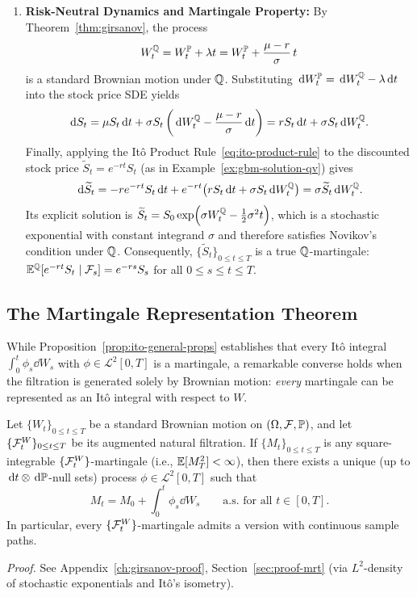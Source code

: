 \begin{example}
\begin{enumerate}
    \item \textbf{Risk-Neutral Dynamics and Martingale Property:} By Theorem~\ref{thm:girsanov}, the process
    \[
    W_t^{\mathbb{Q}} = W_t^{\mathbb{P}} + \lambda t = W_t^{\mathbb{P}} + \frac{\mu - r}{\sigma}\,t
    \]
    is a standard Brownian motion under $\mathbb{Q}$. Substituting $\,\mathrm{d} W_t^{\mathbb{P}} = \,\mathrm{d} W_t^{\mathbb{Q}} - \lambda \,\mathrm{d} t$ into the stock price SDE yields
    \[
    \,\mathrm{d} S_t = \mu S_t \,\mathrm{d} t + \sigma S_t\left(\,\mathrm{d} W_t^{\mathbb{Q}} - \frac{\mu - r}{\sigma}\,\mathrm{d} t\right) = r S_t \,\mathrm{d} t + \sigma S_t \,\mathrm{d} W_t^{\mathbb{Q}}.
    \]
    Finally, applying the It\^o Product Rule~\eqref{eq:ito-product-rule} to the discounted stock price $\widetilde{S}_t = e^{-rt} S_t$ (as in Example~\ref{ex:gbm-solution-qv}) gives
    \[
    \,\mathrm{d}\widetilde{S}_t = -r e^{-rt} S_t \,\mathrm{d} t + e^{-rt}\big(r S_t \,\mathrm{d} t + \sigma S_t \,\mathrm{d} W_t^{\mathbb{Q}}\big) = \sigma \widetilde{S}_t \,\mathrm{d} W_t^{\mathbb{Q}}.
    \]
    Its explicit solution is $\widetilde{S}_t = S_0 \exp\!\left(\sigma W_t^{\mathbb{Q}} - \frac{1}{2}\sigma^2 t\right)$, which is a stochastic exponential with constant integrand $\sigma$ and therefore satisfies Novikov's condition under $\mathbb{Q}$. Consequently, $\{\widetilde{S}_t\}_{0 \le t \le T}$ is a true $\mathbb{Q}$-martingale: $\mathbb{E}^{\mathbb{Q}}[e^{-rt} S_t \mid \mathcal{F}_s] = e^{-rs} S_s$ for all $0 \le s \le t \le T$.
\end{enumerate}
\end{example}

\subsection{The Martingale Representation Theorem}
\label{subsec:martingale-representation}

While Proposition~\ref{prop:ito-general-props} establishes that every It\^o integral $\int_0^t \phi_s \dd W_s$ with $\phi \in \mathcal{L}^2[0, T]$ is a martingale, a remarkable converse holds when the filtration is generated solely by Brownian motion: \emph{every} martingale can be represented as an It\^o integral with respect to $W$.

\begin{theorem}
\label{thm:martingale-representation}
Let $\{W_t\}_{0 \le t \le T}$ be a standard Brownian motion on $(\Omega, \mathcal{F}, \mathbb{P})$, and let $\{\mathcal{F}_t^W\}_{0 \le t \le T}$ be its augmented natural filtration. If $\{M_t\}_{0 \le t \le T}$ is any square-integrable $\{\mathcal{F}_t^W\}$-martingale (i.e., $\mathbb{E}[M_T^2] < \infty$), then there exists a unique (up to $\,\mathrm{d} t \otimes \,\mathrm{d}\mathbb{P}$-null sets) process $\phi \in \mathcal{L}^2[0, T]$ such that
\begin{equation}
\label{eq:martingale-rep}
M_t = M_0 + \int_0^t \phi_s \dd W_s \qquad \text{a.s. for all } t \in [0, T].
\end{equation}
In particular, every $\{\mathcal{F}_t^W\}$-martingale admits a version with continuous sample paths.
\end{theorem}
\noindent\emph{Proof.} See Appendix~\ref{ch:girsanov-proof}, Section~\ref{sec:proof-mrt} (via $L^2$-density of stochastic exponentials and It\^o's isometry).

